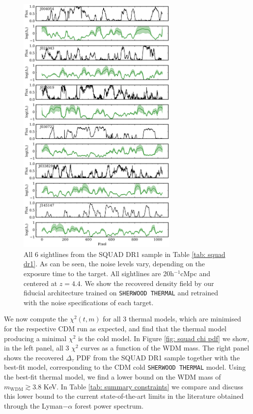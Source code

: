 \begin{figure}
    \centering
    \includegraphics[width=0.7\textwidth]{img/ML/SQUAD_pred.png}
    \caption{All 6 sightlines from the SQUAD DR1 sample in Table \ref{tab: squad dr1}. As can be seen, the noise levels vary, depending on the exposure time to the target. All sightlines are 20h$^{-1}$cMpc and centered at $z=4.4$. We show the recovered density field by our fiducial architecture trained on \texttt{SHERWOOD THERMAL} and retrained with the noise specifications of each target.}
    \label{fig: squad pred}
\end{figure}

We now compute the $\chi^2(t,m)$ for all 3 thermal models, which are minimised for the respective CDM run as expected, and find that the thermal model producing a minimal $\chi^2$ is the cold model. In Figure \ref{fig: squad chi pdf} we show, in the left panel, all 3 $\chi^2$ curves as a function of the WDM mass. The right panel shows the recovered $\Delta_\tau$ PDF from the SQUAD DR1 sample together with the best-fit model, corresponding to the CDM cold \texttt{SHERWOOD THERMAL} model. Using the best-fit thermal model, we find a lower bound on the WDM mass of $m_{\mathrm{WDM}} \gtrsim 3.8$ KeV. In Table \ref{tab: summary constraints} we compare and discuss this lower bound to the current state-of-the-art limits in the literature obtained through the Lyman$-\alpha$ forest power spectrum.


